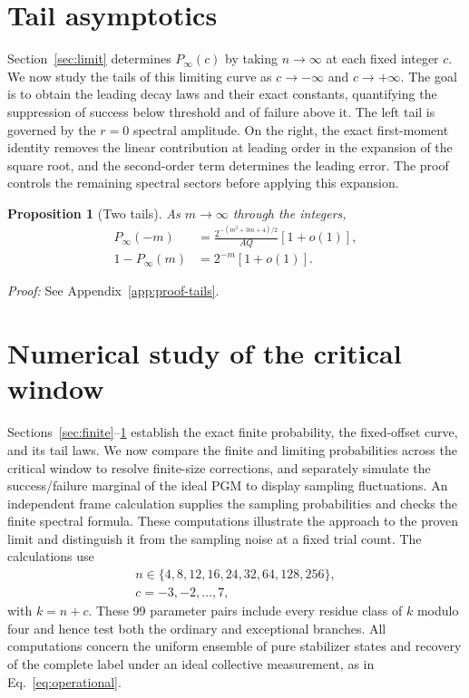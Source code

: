 \documentclass[journal,twocolumn]{IEEEtran}
\newtheorem{proposition}[theorem]{Proposition}
\theoremstyle{definition}
\theoremstyle{plain}
\begin{document}
\section{Tail asymptotics}
\label{sec:tails}
Section~\ref{sec:limit} determines $P_\infty(c)$ by taking $n\to\infty$
at each fixed integer $c$.  We now study the tails of this limiting
curve as $c\to-\infty$ and $c\to+\infty$.  The goal is to obtain the
leading decay laws and their exact constants, quantifying the
suppression of success below threshold and of failure above it.
The left tail is governed by the $r=0$ spectral amplitude.  On the right,
the exact first-moment identity removes the linear contribution at
leading order in the expansion of the square root, and the second-order
term determines the leading error.  The proof controls the remaining
spectral sectors before applying this expansion.

\begin{proposition}[Two tails]
\label{propS:tails}
As $m\to\infty$ through the integers,
\begin{align}
 P_\infty(-m)
 &=\frac{2^{-(m^2+3m+4)/2}}{AQ}
   [1+o(1)],
 \label{eqS:left-asymptotic}\\
 1-P_\infty(m)
 &=2^{-m}[1+o(1)].
 \label{eqS:right-asymptotic}
\end{align}
\end{proposition}

\noindent\emph{Proof:} See Appendix~\ref{app:proof-tails}.\par

\section{Numerical study of the critical window}
\label{sec:numerics}
Sections~\ref{sec:finite}--\ref{sec:tails} establish the exact finite
probability, the fixed-offset curve, and its tail laws.  We now compare
the finite and limiting probabilities across the critical window to
resolve finite-size corrections, and separately simulate the
success/failure marginal of the ideal PGM to display sampling
fluctuations.  An independent frame calculation supplies the sampling
probabilities and checks the finite spectral formula.  These
computations illustrate the approach to the proven limit and
distinguish it from the sampling noise at a fixed trial count.
The calculations use
\begin{equation*}
 \begin{gathered}
 n\in\{4,8,12,16,24,32,64,128,256\},\\
 c=-3,-2,\ldots,7,
 \end{gathered}
\end{equation*}
with $k=n+c$.  These 99 parameter pairs include every residue class of
$k$ modulo four and hence test both the ordinary and exceptional branches.
All computations concern the uniform ensemble of pure stabilizer states
and recovery of the complete label under an ideal collective measurement,
as in Eq.~\eqref{eq:operational}.
\end{document}
